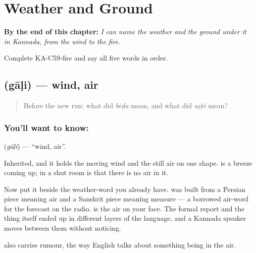 
\chapter{Weather and Ground}
\label{ch:ka-weather-ground}

\begin{chapteropening}
\textbf{By the end of this chapter:} \emph{I can name the weather and the ground under it in Kannada, from the wind to the fire.}

Complete KA-C59-fire and say all five words in order.
\end{chapteropening}

\section[\texorpdfstring{\kn{ಗಾಳಿ} (gāḷi)}{ಗಾಳಿ (gāḷi)}]{ (gāḷi) — wind, air}

\label{lesson:KA-C59-wind}



\begin{quote}
Before the new run: what did \emph{bēḍa} mean, and what did \emph{aṣṭē} mean?
\end{quote}

\subsection*{You'll want to know: }
\textbf{} (\emph{gāḷi}) — \textquotedblleft{}wind, air\textquotedblright{}.

Inherited, and it holds the moving wind and the still air on one shape.   is a breeze coming up;   in a shut room is that there is no air in it.

Now put it beside the weather-word you already have.  was built from a Persian piece meaning air and a Sanskrit piece meaning measure — a borrowed air-word for the forecast on the radio.  is the air on your face. The formal report and the thing itself ended up in different layers of the language, and a Kannada speaker moves between them without noticing.

 also carries rumour, the way English talks about something being in the air.


